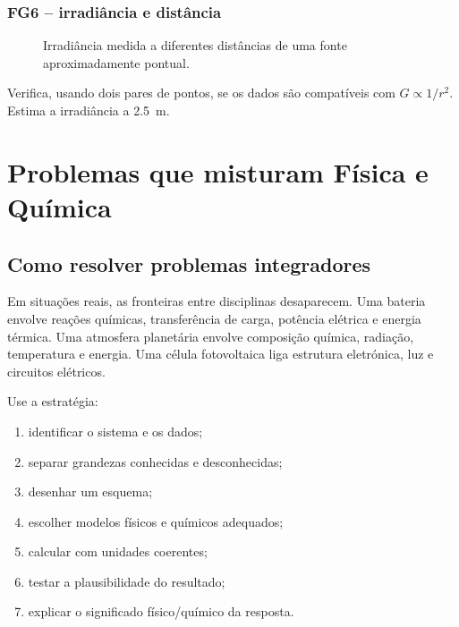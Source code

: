 \documentclass[11pt,a4paper,oneside]{book}
\begin{document}
\subsection*{FG6 -- irradiância e distância}
\begin{figure}[H]
\centering
{}
\caption{Irradiância medida a diferentes distâncias de uma fonte aproximadamente pontual.}
\end{figure}
\begin{exercicios}[title=Exercício FG6]
Verifica, usando dois pares de pontos, se os dados são compatíveis com $G\propto1/r^2$. Estima a irradiância a \SI{2.5}{m}.
\end{exercicios}


\chapter{Problemas que misturam Física e Química}

\section{Como resolver problemas integradores}
Em situações reais, as fronteiras entre disciplinas desaparecem. Uma bateria envolve reações químicas, transferência de carga, potência elétrica e energia térmica. Uma atmosfera planetária envolve composição química, radiação, temperatura e energia. Uma célula fotovoltaica liga estrutura eletrónica, luz e circuitos elétricos.

Use a estratégia:
\begin{enumerate}
  \item identificar o sistema e os dados;
  \item separar grandezas conhecidas e desconhecidas;
  \item desenhar um esquema;
  \item escolher modelos físicos e químicos adequados;
  \item calcular com unidades coerentes;
  \item testar a plausibilidade do resultado;
  \item explicar o significado físico/químico da resposta.
\end{enumerate}
\end{document}
